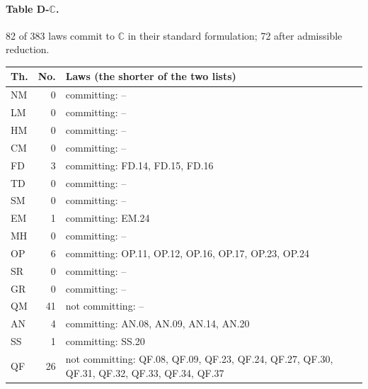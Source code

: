 \paragraph{Table D-$\mathbb C$.} 82 of 383 laws commit to $\mathbb C$ in their standard formulation; 72 after admissible reduction.
{\scriptsize\setlength{\tabcolsep}{3pt}
\begin{longtable}{l r p{12.2cm}}
\toprule
Th. & No. & Laws (the shorter of the two lists) \\
\midrule
\endhead
\bottomrule\endfoot
NM & 0 & committing: -- \\
LM & 0 & committing: -- \\
HM & 0 & committing: -- \\
CM & 0 & committing: -- \\
FD & 3 & committing: FD.14, FD.15, FD.16 \\
TD & 0 & committing: -- \\
SM & 0 & committing: -- \\
EM & 1 & committing: EM.24 \\
MH & 0 & committing: -- \\
OP & 6 & committing: OP.11, OP.12, OP.16, OP.17, OP.23, OP.24 \\
SR & 0 & committing: -- \\
GR & 0 & committing: -- \\
QM & 41 & not committing: -- \\
AN & 4 & committing: AN.08, AN.09, AN.14, AN.20 \\
SS & 1 & committing: SS.20 \\
QF & 26 & not committing: QF.08, QF.09, QF.23, QF.24, QF.27, QF.30, QF.31, QF.32, QF.33, QF.34, QF.37 \\
\end{longtable}
}
